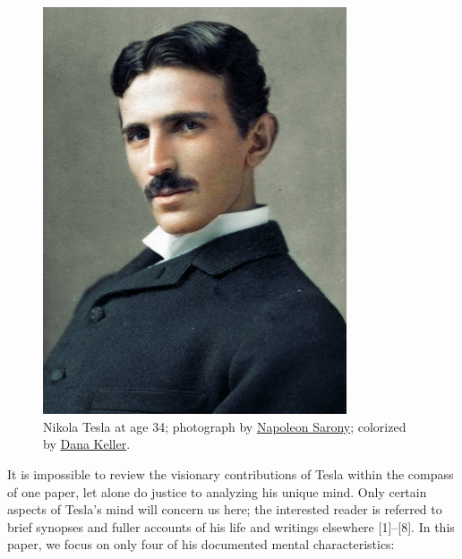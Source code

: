 \documentclass[
  12pt,
  british,
  a4paper,
]{article}
\begin{document}
\begin{figure}
\hypertarget{fig:tesla}{%
\centering
\includegraphics[width=0.8\textwidth,height=\textheight]{images/tesla_in_color.jpg}
\caption[Nikola Tesla at age 34; photograph by
\href{https://en.wikipedia.org/wiki/Napoleon_Sarony}{Napoleon Sarony};
colorized by \href{http://www.danarkeller.com/}{Dana Keller}.]{Nikola
Tesla at age 34; photograph by
\href{https://en.wikipedia.org/wiki/Napoleon_Sarony}{Napoleon Sarony};
colorized by \href{http://www.danarkeller.com/}{Dana
Keller}.\footnotemark{}}\label{fig:tesla}
}
\end{figure}

It is impossible to review the visionary contributions of Tesla within
the compass of one paper, let alone do justice to analyzing his unique
mind. Only certain aspects of Tesla's mind will concern us here; the
interested reader is referred to brief synopses and fuller accounts of
his life and writings elsewhere {[}1{]}--{[}8{]}. In this paper, we
focus on only four of his documented mental characteristics:
\end{document}
